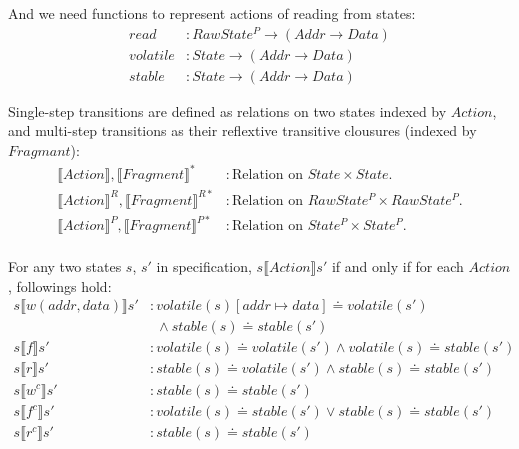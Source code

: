\documentclass[a4paper,11pt]{article}
\theoremstyle{definition}
\begin{document}
And we need functions to represent actions of reading from states:
\begin{align*}
	read &: \mathit{RawState^P} \to (\mathit{Addr} \to \mathit{Data})\\
	volatile &: \mathit{State} \to (\mathit{Addr} \to \mathit{Data})\\
	stable &: \mathit{State} \to (\mathit{Addr} \to \mathit{Data})
\end{align*}

\newpage

Single-step transitions are defined as relations on two states indexed by $\mathit{Action}$, and multi-step transitions as their reflextive transitive clousures (indexed by $\mathit{Fragmant}$):
\begin{align*}
	\llbracket \mathit{Action} \rrbracket, \llbracket \mathit{Fragment} \rrbracket^* &: \text{Relation on $\mathit{State \times State}$.}\\
	\llbracket \mathit{Action} \rrbracket^R, \llbracket \mathit{Fragment} \rrbracket^{R*} &: \text{Relation on $\mathit{RawState^P \times RawState^P}$.}\\
	\llbracket \mathit{Action} \rrbracket^P, \llbracket \mathit{Fragment} \rrbracket^{P*} &: \text{Relation on $\mathit{State^P \times State^P}$.}\\
\end{align*}

For any two states $s$, $s'$ in specification, $s \llbracket \mathit{Action} \rrbracket s'$ if and only if for each $\mathit{Action}$, followings hold:
\begin{align*}
	s \llbracket w(addr, data) \rrbracket s' &: \mathit{volatile(s)[addr \mapsto data]} \doteq \mathit{volatile(s')}\\
	& \ \  \land stable(s) \doteq stable(s')\\
	s \llbracket f \rrbracket s' &: \mathit{volatile(s)} \doteq \mathit{volatile(s')} \land \mathit{volatile(s)} \doteq \mathit{stable(s')}\\
	s \llbracket r \rrbracket s' &: \mathit{stable(s)} \doteq \mathit{volatile(s')} \land \mathit{stable(s)} \doteq \mathit{stable(s')}\\
	s \llbracket w^c \rrbracket s' &: \mathit{stable(s)} \doteq \mathit{stable(s')}\\
	s \llbracket f^c \rrbracket s' &: \mathit{volatile(s)} \doteq \mathit{stable(s')} \lor \mathit{stable(s)} \doteq \mathit{stable(s')}\\
	s \llbracket r^c \rrbracket s' &: \mathit{stable(s)} \doteq \mathit{stable(s')}
\end{align*}
\end{document}
